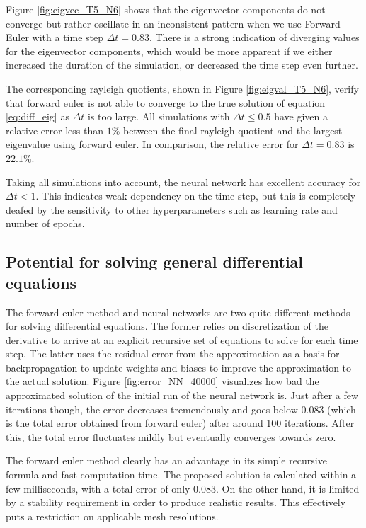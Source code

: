 \documentclass[12pt]{extarticle}
\begin{document}
Figure \ref{fig:eigvec_T5_N6} shows that the eigenvector components do not converge but rather oscillate in an inconsistent pattern when we use Forward Euler with a time step $\Delta t =0.83$. There is a strong indication of diverging values for the eigenvector components, which would be more apparent if we either increased the duration of the simulation, or decreased the time step even further. 

 The corresponding rayleigh quotients, shown in Figure \ref{fig:eigval_T5_N6}, verify that forward euler is not able to converge to the true solution of equation \eqref{eq:diff_eig} as $\Delta t$ is too large. All simulations with $\Delta t \leq 0.5$ have given a relative error less than $1\%$ between the final rayleigh quotient and the largest eigenvalue using forward euler. In comparison, the relative error for $\Delta t = 0.83$ is $22.1\%$.

Taking all simulations into account, the neural network has excellent accuracy for $\Delta t < 1$. This indicates weak dependency on the time step, but this is completely deafed by the sensitivity to other hyperparameters such as learning rate and number of epochs.



\subsection{Potential for solving general differential equations}
The forward euler method and neural networks are two quite different methods for solving differential equations. The former relies on discretization of the derivative to arrive at an explicit recursive set of equations to solve for each time step. The latter uses the residual error from the approximation as a basis for backpropagation to update weights and biases to improve the approximation to the actual solution. Figure \ref{fig:error_NN_40000} visualizes how bad the approximated solution of the initial run of the neural network is. Just after a few iterations though, the error decreases tremendously and goes below 0.083 (which is the total error obtained from forward euler) after around 100 iterations. After this, the total error fluctuates mildly but eventually converges towards zero.
 
\par The forward euler method clearly has an advantage in its simple recursive formula and fast computation time. The proposed solution is calculated within a few milliseconds, with a total error of only 0.083. On the other hand, it is limited by a stability requirement in order to produce realistic results. This effectively puts a restriction on applicable mesh resolutions.
\end{document}

